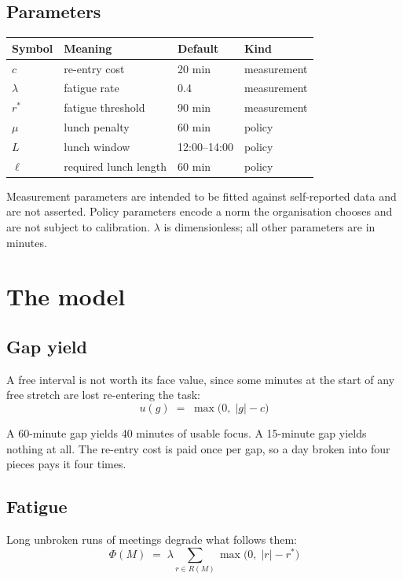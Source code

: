 \documentclass[11pt]{article}
\begin{document}
\subsection*{Parameters}

\begin{tabular}{@{}llll@{}}
\toprule
Symbol & Meaning & Default & Kind \\
\midrule
$c$ & re-entry cost & 20 min & measurement \\
$\lambda$ & fatigue rate & 0.4 & measurement \\
$r^{*}$ & fatigue threshold & 90 min & measurement \\
$\mu$ & lunch penalty & 60 min & policy \\
$L$ & lunch window & 12:00--14:00 & policy \\
$\ell$ & required lunch length & 60 min & policy \\
\bottomrule
\end{tabular}

\medskip

Measurement parameters are intended to be fitted against self-reported data
and are not asserted. Policy parameters encode a norm the organisation
chooses and are not subject to calibration. $\lambda$ is dimensionless; all
other parameters are in minutes.

\section{The model}

\subsection{Gap yield}

A free interval is not worth its face value, since some minutes at the start
of any free stretch are lost re-entering the task:
\[
u(g) \;=\; \max\bigl(0,\; |g| - c\bigr)
\]

A 60-minute gap yields 40 minutes of usable focus. A 15-minute gap yields
nothing at all. The re-entry cost is paid once per gap, so a day broken into
four pieces pays it four times.

\subsection{Fatigue}

Long unbroken runs of meetings degrade what follows them:
\[
\Phi(M) \;=\; \lambda \sum_{r \in R(M)} \max\bigl(0,\; |r| - r^{*}\bigr)
\]
\end{document}
